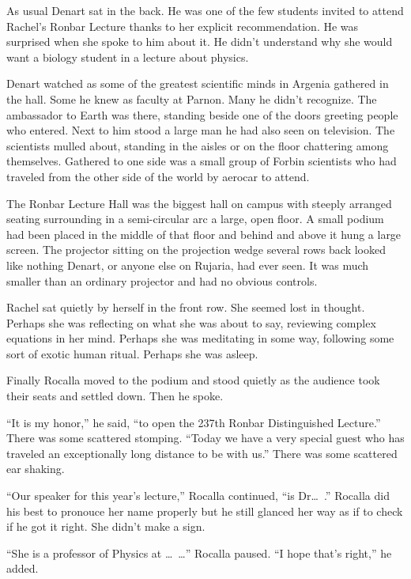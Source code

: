

As usual Denart sat in the back. He was one of the few students invited to attend Rachel's
Ronbar Lecture thanks to her explicit recommendation. He was surprised when she spoke to him
about it. He didn't understand why she would want a biology student in a lecture about physics.

Denart watched as some of the greatest scientific minds in Argenia gathered in the hall. Some he
knew as faculty at Parnon. Many he didn't recognize. The ambassador to Earth was there, standing
beside one of the doors greeting people who entered. Next to him stood a large man he had also
seen on television. The scientists mulled about, standing in the aisles or on the floor
chattering among themselves. Gathered to one side was a small group of Forbin scientists who had
traveled from the other side of the world by aerocar to attend.

The Ronbar Lecture Hall was the biggest hall on campus with steeply arranged seating surrounding
in a semi-circular arc a large, open floor. A small podium had been placed in the middle of that
floor and behind and above it hung a large screen. The projector sitting on the projection wedge
several rows back looked like nothing Denart, or anyone else on Rujaria, had ever seen. It was
much smaller than an ordinary projector and had no obvious controls.

Rachel sat quietly by herself in the front row. She seemed lost in thought. Perhaps she was
reflecting on what she was about to say, reviewing complex equations in her mind. Perhaps she
was meditating in some way, following some sort of exotic human ritual. Perhaps she was asleep.

Finally Rocalla moved to the podium and stood quietly as the audience took their seats and
settled down. Then he spoke.

``It is my honor,'' he said, ``to open the 237th Ronbar Distinguished Lecture.'' There was some
scattered stomping. ``Today we have a very special guest who has traveled an exceptionally long
distance to be with us.'' There was some scattered ear shaking.

``Our speaker for this year's lecture,'' Rocalla continued, ``is Dr\ldots\ .'' Rocalla did his best to pronouce her name properly but he still glanced her way as
if to check if he got it right. She didn't make a sign.

``She is a professor of Physics at \ldots\ \ldots'' Rocalla paused. ``I
hope that's right,'' he added.


